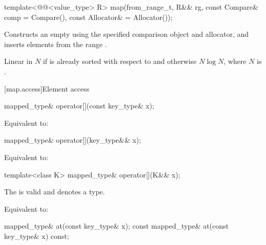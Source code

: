 %
\begin{itemdecl}
template<@@<value_type> R>
  map(from_range_t, R&& rg, const Compare& comp = Compare(), const Allocator& = Allocator());
\end{itemdecl}

\begin{itemdescr}
\pnum
\effects
Constructs an empty 
using the specified comparison object and allocator,
and inserts elements from the range .

\pnum
\complexity
Linear in $N$ if  is already sorted with respect to  and
otherwise $N \log N$, where $N$ is .
\end{itemdescr}

[map.access]{Element access}

%
\begin{itemdecl}
mapped_type& operator[](const key_type& x);
\end{itemdecl}

\begin{itemdescr}
\pnum
\effects
Equivalent to: 
\end{itemdescr}

%
\begin{itemdecl}
mapped_type& operator[](key_type&& x);
\end{itemdecl}

\begin{itemdescr}
\pnum
\effects
Equivalent to: 
\end{itemdescr}

%
\begin{itemdecl}
template<class K> mapped_type& operator[](K&& x);
\end{itemdecl}

\begin{itemdescr}
\pnum
\constraints
The  
is valid and denotes a type.

\pnum
\effects
Equivalent to: 
\end{itemdescr}

%
\begin{itemdecl}
mapped_type&       at(const key_type& x);
const mapped_type& at(const key_type& x) const;
\end{itemdecl}

